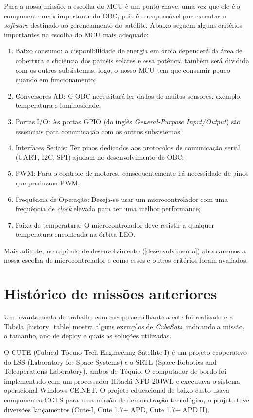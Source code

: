 Para a nossa missão, a escolha do MCU é um ponto-chave, uma vez que ele é o componente mais importante do OBC, pois é o responsável por executar o \textit{software} destinado ao gerenciamento do satélite. Abaixo seguem alguns critérios importantes na escolha do MCU mais adequado:

\begin{enumerate}
    \item Baixo consumo: a disponibilidade de energia em órbia dependerá da área de cobertura e eficiência dos painéis solares e essa potência também será dividida com os outros subsistemas, logo, o nosso MCU tem que consumir pouco quando em funcionamento;
    \item Conversores AD: O OBC necessitará ler dados de muitos sensores, exemplo: temperatura e luminosidade;
    \item Portas I/O: As portas GPIO (do inglês \textit{General-Purpose Input/Output}) são essenciais para comunicação com os outros subsistemas;
    \item Interfaces Seriais: Ter pinos dedicados aos protocolos de comunicação serial (UART, I2C, SPI) ajudam no desenvolvimento do OBC;
    \item PWM: Para o controle de motores, consequentemente há necessidade de pinos que produzam PWM;
    \item Frequência de Operação: Deseja-se usar um microcontrolador com uma frequência de \textit{clock} elevada para ter uma melhor performance;
    \item Faixa de temperatura: O microcontrolador deve resistir a qualquer temperatura encontrada na órbita LEO.
\end{enumerate}

Mais adiante, no capítulo de desenvolvimento (\ref{desenvolvimento}) abordaremos a nossa escolha de microcontrolador e como esses e outros critérios foram avaliados.


\section{Histórico de missões anteriores}\label{missions_history}

Um levantamento de trabalho com escopo semelhante a este foi realizado e a Tabela \ref{history_table} mostra alguns exemplos de \textit{CubeSats}, indicando a missão, o tamanho, ano de deploy e quais as soluções utilizadas.



O CUTE \cite{cute1_ref} (Cubical  Tóquio  Tech  Engineering  Satellite-I) é um projeto cooperativo do LSS (Laboratory for Space Systems) e o SRTL (Space Robotics and Teleoperations Laboratory), ambos de Tóquio. O computador de bordo foi implementado com um processador Hitachi NPD-20JWL e executava o sistema operacional Windows CE.NET. O  projeto  educacional  de  baixo  custo  usava componentes COTS para uma missão de demonstração tecnológica, o projeto teve diversões lançamentos (Cute-I, Cute 1.7+ APD, Cute 1.7+ APD II). 

